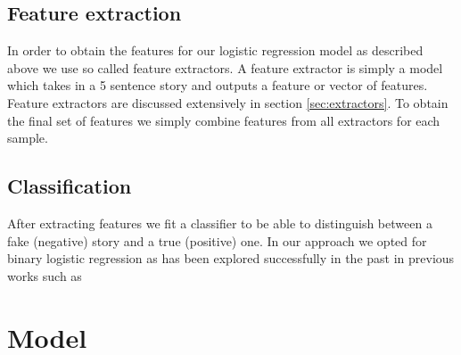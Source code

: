\documentclass{article}
\begin{document}
\subsection{Feature extraction}
\label{sec:extraction}
In order to obtain the features for our logistic regression model as described above we use so called feature extractors. A feature extractor is simply a model which takes in a 5 sentence story and outputs a feature or vector of features. Feature extractors are discussed extensively in section \ref{sec:extractors}. To obtain the final set of features we simply combine features from all extractors for each sample.

\subsection{Classification}
\label{sec:classifier}
After extracting features we fit a classifier to be able to distinguish between a fake (negative) story and a true (positive) one. In our approach we opted for binary logistic regression as has been explored successfully in the past in previous works such as \cite{UWNLP,Goel,COGCOMP}

\section{Model}
\end{document}
